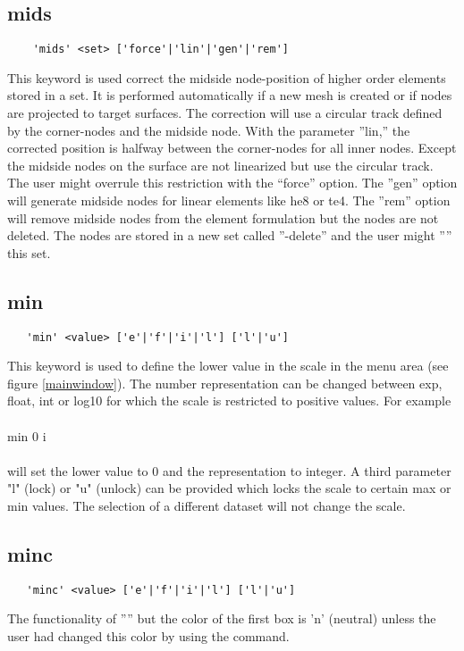 \documentclass{article}
\begin{document}
\subsection{\label{mids}mids}
\begin{verbatim}
    'mids' <set> ['force'|'lin'|'gen'|'rem']
\end{verbatim}
This keyword is used correct the midside node-position of higher order elements stored in a set. It is performed automatically if a new mesh is created or if nodes are projected to target surfaces. The correction will use a circular track defined by the corner-nodes and the midside node. With the parameter ''lin,'' the corrected position is halfway between the corner-nodes for all inner nodes. Except the midside nodes on the surface are not linearized but use the circular track. The user might overrule this restriction with the ``force'' option. The ''gen'' option will generate midside nodes for linear elements like he8 or te4. The ''rem'' option will remove midside nodes from the element formulation but the nodes are not deleted. The nodes are stored in a new set called ''-delete'' and the user might '''' this set. 

\subsection{\label{min}min}
\begin{verbatim}
   'min' <value> ['e'|'f'|'i'|'l'] ['l'|'u']
\end{verbatim}
This keyword is used to define the lower value in the scale in the menu area (see figure \ref{mainwindow}). The number representation can be changed between exp, float, int or log10 for which the scale is restricted to positive values. For example\\\\min 0 i\\\\will set the lower value to 0 and the representation to integer. A third parameter "l" (lock) or "u" (unlock) can be provided which locks the scale to certain max or min values. The selection of a different dataset will not change the scale.
 
\subsection{\label{minc}minc}
\begin{verbatim}
   'minc' <value> ['e'|'f'|'i'|'l'] ['l'|'u']
\end{verbatim}
The functionality of '''' but the color of the first box is 'n' (neutral) unless the user had changed this color by using the  command.
\end{document}
